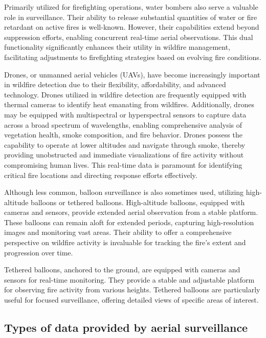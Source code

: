\documentclass[
  12 pt,
]{Nemilov}
\begin{document}
Primarily utilized for firefighting operations, water bombers also serve a valuable role in surveillance. Their ability to release substantial quantities of water or fire retardant on active fires is well-known. However, their capabilities extend beyond suppression efforts, enabling concurrent real-time aerial observations. This dual functionality significantly enhances their utility in wildfire management, facilitating adjustments to firefighting strategies based on evolving fire conditions.

Drones, or unmanned aerial vehicles (UAVs), have become increasingly important in wildfire detection due to their flexibility, affordability, and advanced technology. Drones utilized in wildfire detection are frequently equipped with thermal cameras to identify heat emanating from wildfires. Additionally, drones may be equipped with multispectral or hyperspectral sensors to capture data across a broad spectrum of wavelengths, enabling comprehensive analysis of vegetation health, smoke composition, and fire behavior. Drones possess the capability to operate at lower altitudes and navigate through smoke, thereby providing unobstructed and immediate visualizations of fire activity without compromising human lives. This real-time data is paramount for identifying critical fire locations and directing response efforts effectively.

Although less common, balloon surveillance is also sometimes used, utilizing high-altitude balloons or tethered balloons. High-altitude balloons, equipped with cameras and sensors, provide extended aerial observation from a stable platform. These balloons can remain aloft for extended periods, capturing high-resolution images and monitoring vast areas. Their ability to offer a comprehensive perspective on wildfire activity is invaluable for tracking the fire's extent and progression over time.

Tethered balloons, anchored to the ground, are equipped with cameras and sensors for real-time monitoring. They provide a stable and adjustable platform for observing fire activity from various heights. Tethered balloons are particularly useful for focused surveillance, offering detailed views of specific areas of interest.

\subsection{Types of data provided by aerial surveillance}\label{types-of-data-provided-by-aerial-surveillance}
\end{document}
